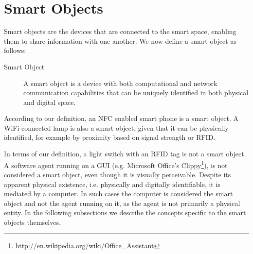 %
%




\section{Smart Objects}

Smart objects are the devices that are connected to the smart space, enabling them to share information with one another. We now define a smart object as follows:

\begin{description}
	\item[Smart Object]A smart object is a device with both computational and network communication capabilities that can be uniquely identified in both physical and digital space.
\end{description}

According to our definition, an \ac{NFC} enabled smart phone is a smart object. A WiFi-connected lamp is also a smart object, given that it can be physically identified, for example by proximity based on signal strength or \ac{RFID}. 

 In terms of our definition, a light switch with an \ac{RFID} tag is not a smart object. A software agent running on a \ac{GUI} (e.g. Microsoft Office's Clippy\footnote{http://en.wikipedia.org/wiki/Office\_Assistant}), is not considered a smart object, even though it is visually perceivable. Despite its apparent physical existence, i.e. physically and digitally identifiable, it is mediated by a computer. In such cases the computer is considered the smart object and not the agent running on it, as the agent is not primarily a physical entity. In the following subsections we describe the concepts specific to the smart objects themselves.

